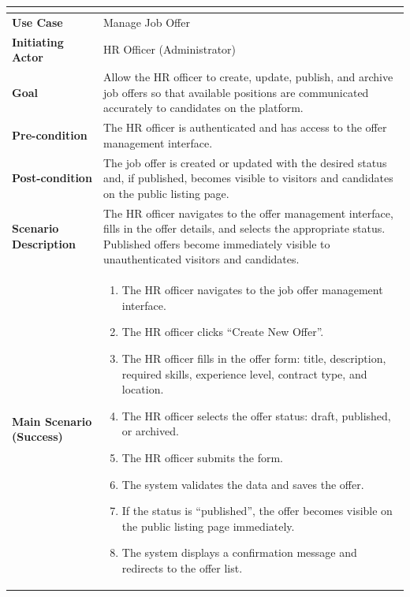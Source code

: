\setlength{\tabcolsep}{4pt}
\renewcommand{\arraystretch}{1.4}
\begin{table}[H]
\centering
\small
\begin{tabularx}{\textwidth}{|>{\bfseries\arraybackslash}p{4cm}|X|}
\hline
\rowcolor{headerblue}
\multicolumn{2}{|c|}{\textbf{Use Case: Manage Job Offer}} \\
\hline
Use Case            & Manage Job Offer \\
\hline
Initiating Actor    & HR Officer (Administrator) \\
\hline
Goal                & Allow the HR officer to create, update, publish, and archive job offers so that available positions are communicated accurately to candidates on the platform. \\
\hline
Pre-condition       & The HR officer is authenticated and has access to the offer management interface. \\
\hline
Post-condition      & The job offer is created or updated with the desired status and, if published, becomes visible to visitors and candidates on the public listing page. \\
\hline
Scenario Description &
The HR officer navigates to the offer management interface, fills in the offer details, and selects the appropriate status. Published offers become immediately visible to unauthenticated visitors and candidates. \\
\hline
Main Scenario (Success) &
\begin{enumerate}[leftmargin=*, label=\arabic*., topsep=0pt, itemsep=0pt]
    \item The HR officer navigates to the job offer management interface.
    \item The HR officer clicks ``Create New Offer''.
    \item The HR officer fills in the offer form: title, description, required skills, experience level, contract type, and location.
    \item The HR officer selects the offer status: draft, published, or archived.
    \item The HR officer submits the form.
    \item The system validates the data and saves the offer.
    \item If the status is ``published'', the offer becomes visible on the public listing page immediately.
    \item The system displays a confirmation message and redirects to the offer list.
\end{enumerate} \\

\end{tabularx}
\end{table}
